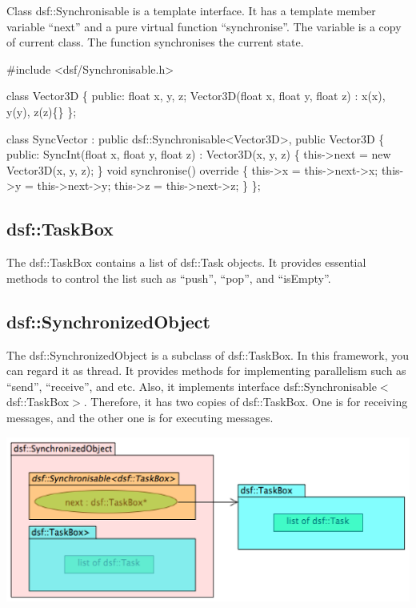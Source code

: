 Class dsf\+::\+Synchronisable is a template interface. It has a template member variable “next” and a pure virtual function “synchronise”. The variable is a copy of current class. The function synchronises the current state. 
\begin{DoxyCode}
\textcolor{preprocessor}{#include <dsf/Synchronisable.h>}

\textcolor{keyword}{class }Vector3D
\{
\textcolor{keyword}{public}:
    \textcolor{keywordtype}{float} x, y, z;
    Vector3D(\textcolor{keywordtype}{float} x, \textcolor{keywordtype}{float} y, \textcolor{keywordtype}{float} z) : x(x), y(y), z(z)\{\}
\};

\textcolor{keyword}{class }SyncVector : \textcolor{keyword}{public} dsf::Synchronisable<Vector3D>, \textcolor{keyword}{public} Vector3D
\{
\textcolor{keyword}{public}:
    SyncInt(\textcolor{keywordtype}{float} x, \textcolor{keywordtype}{float} y, \textcolor{keywordtype}{float} z) : Vector3D(x, y, z) \{
        this->next = \textcolor{keyword}{new} Vector3D(x, y, z);
    \}
    \textcolor{keywordtype}{void} synchronise()\textcolor{keyword}{ override }\{
        this->x = this->next->x;
        this->y = this->next->y;
        this->z = this->next->z;
    \}
\};
\end{DoxyCode}
\hypertarget{_framework_design_FrameworkDesignInterfacedsfTaskBox}{}\subsection{dsf\+::\+Task\+Box}\label{_framework_design_FrameworkDesignInterfacedsfTaskBox}
The dsf\+::\+Task\+Box contains a list of dsf\+::\+Task objects. It provides essential methods to control the list such as “push”, “pop”, and “is\+Empty”.\hypertarget{_framework_design_FrameworkDesignInterfacedsfSynchronizedObject}{}\subsection{dsf\+::\+Synchronized\+Object}\label{_framework_design_FrameworkDesignInterfacedsfSynchronizedObject}
The dsf\+::\+Synchronized\+Object is a subclass of dsf\+::\+Task\+Box. In this framework, you can regard it as thread. It provides methods for implementing parallelism such as “send”, “receive”, and etc. Also, it implements interface dsf\+::\+Synchronisable$<$dsf\+::\+Task\+Box$>$. Therefore, it has two copies of dsf\+::\+Task\+Box. One is for receiving messages, and the other one is for executing messages. 
\begin{DoxyImageNoCaption}
  \mbox{\includegraphics[width=\textwidth,height=\textheight/2,keepaspectratio=true]{DesignInterfaceSynchronizedObject.png}}
\end{DoxyImageNoCaption}
